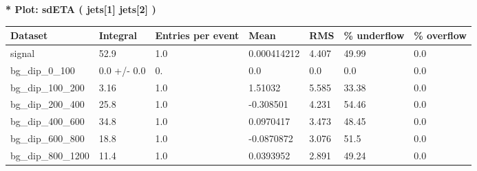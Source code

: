 \documentclass[a4paper, 10pt]{article}
\begin{document}
\textbf{* Plot: sdETA ( jets[1] jets[2] ) }\\
   \begin{table}[H]
  \begin{center}
    \begin{tabular}{|m{23.0mm}|m{23.0mm}|m{18.0mm}|m{19.0mm}|m{19.0mm}|m{19.0mm}|m{19.0mm}|}
      \hline
      {\cellcolor{yellow}         Dataset}& {\cellcolor{yellow}         Integral}& {\cellcolor{yellow}         Entries per event}& {\cellcolor{yellow}         Mean}& {\cellcolor{yellow}         RMS}& {\cellcolor{yellow}         \% underflow}& {\cellcolor{yellow}         \% overflow}\\
      \hline
      {\cellcolor{white}         signal}& {\cellcolor{white}         52.9}& {\cellcolor{white}         1.0}& {\cellcolor{white}         0.000414212}& {\cellcolor{white}         4.407}& {\cellcolor{red}         49.99}& {\cellcolor{red}         0.0}\\
      \hline
      {\cellcolor{white}         bg\_dip\_0\_100}& {\cellcolor{white}         0.0 +/\-- 0.0}& {\cellcolor{white}         0.}& {\cellcolor{white}         0.0}& {\cellcolor{white}         0.0}& {\cellcolor{green}         0.0}& {\cellcolor{green}         0.0}\\
      \hline
      {\cellcolor{white}         bg\_dip\_100\_200}& {\cellcolor{white}         3.16}& {\cellcolor{white}         1.0}& {\cellcolor{white}         1.51032}& {\cellcolor{white}         5.585}& {\cellcolor{red}         33.38}& {\cellcolor{red}         0.0}\\
      \hline
      {\cellcolor{white}         bg\_dip\_200\_400}& {\cellcolor{white}         25.8}& {\cellcolor{white}         1.0}& {\cellcolor{white}         -0.308501}& {\cellcolor{white}         4.231}& {\cellcolor{red}         54.46}& {\cellcolor{red}         0.0}\\
      \hline
      {\cellcolor{white}         bg\_dip\_400\_600}& {\cellcolor{white}         34.8}& {\cellcolor{white}         1.0}& {\cellcolor{white}         0.0970417}& {\cellcolor{white}         3.473}& {\cellcolor{red}         48.45}& {\cellcolor{red}         0.0}\\
      \hline
      {\cellcolor{white}         bg\_dip\_600\_800}& {\cellcolor{white}         18.8}& {\cellcolor{white}         1.0}& {\cellcolor{white}         -0.0870872}& {\cellcolor{white}         3.076}& {\cellcolor{red}         51.5}& {\cellcolor{red}         0.0}\\
      \hline
      {\cellcolor{white}         bg\_dip\_800\_1200}& {\cellcolor{white}         11.4}& {\cellcolor{white}         1.0}& {\cellcolor{white}         0.0393952}& {\cellcolor{white}         2.891}& {\cellcolor{red}         49.24}& {\cellcolor{red}         0.0}\\

\end{tabular}
\end{center}
\end{table}
\end{document}
